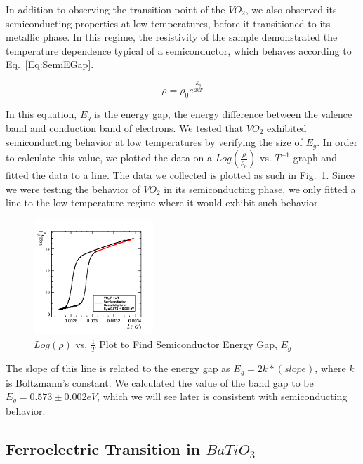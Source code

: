\documentclass[%
 reprint,
 amsmath,amssymb,
 aps,
 pra,
]{revtex4-1}
\begin{document}
In addition to observing the transition point of the $VO_{2}$, we also observed its semiconducting properties at low temperatures, before it transitioned to its metallic phase. In this regime, the resistivity of the sample demonstrated the temperature dependence typical of a semiconductor, which behaves according to Eq.~\ref{Eq:SemiEGap}.

\begin{equation}\label{Eq:SemiEGap}
\rho = \rho_{0} e^{\frac{E_{g}}{2kT}}
\end{equation}

\noindent In this equation, $E_{g}$ is the energy gap, the energy difference between the valence band and conduction band of electrons. We tested that $VO_{2}$ exhibited semiconducting behavior at low temperatures by verifying the size of $E_{g}$. In order to calculate this value, we plotted the data on a $Log(\frac{\rho}{\rho_{0}})$ vs. $T^{-1}$ graph and fitted the data to a line. The data we collected is plotted as such in Fig.~\ref{Fig:RvT2}. Since we were testing the behavior of $VO_{2}$ in its semiconducting phase, we only fitted a line to the low temperature regime where it would exhibit such behavior.

\begin{figure}[H]
	\centering
	\includegraphics[width=0.4\textwidth]{VO2_LogRvTInv.png}
	\caption{$Log(\rho)$ vs. $\frac{1}{T}$ Plot to Find Semiconductor Energy Gap, $E_{g}$}
	\label{Fig:RvT2}
\end{figure}

\noindent The slope of this line is related to the energy gap as $E_{g} = 2k*(slope)$, where $k$ is Boltzmann's constant. We calculated the value of the band gap to be $E_{g} = 0.573 \pm 0.002 eV$, which we will see later is consistent with semiconducting behavior.

\subsection{Ferroelectric Transition in $BaTiO_{3}$}
\end{document}

